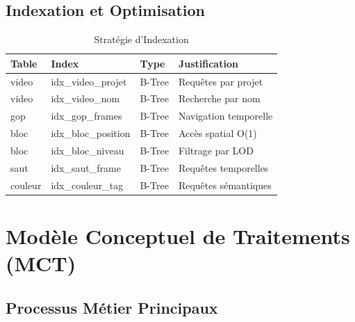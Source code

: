 \documentclass[12pt,a4paper]{article}
\begin{document}
	\subsection{Indexation et Optimisation}
	\label{subsec:indexation}
	
	\begin{table}[h]
		\centering
		\caption{Stratégie d'Indexation}
		\label{tab:indexation}
		\begin{tabular}{@{}llll@{}}
			\toprule
			\textbf{Table} & \textbf{Index} & \textbf{Type} & \textbf{Justification} \\
			\midrule
			video & idx\_video\_projet & B-Tree & Requêtes par projet \\
			video & idx\_video\_nom & B-Tree & Recherche par nom \\
			gop & idx\_gop\_frames & B-Tree & Navigation temporelle \\
			bloc & idx\_bloc\_position & B-Tree & Accès spatial O(1) \\
			bloc & idx\_bloc\_niveau & B-Tree & Filtrage par LOD \\
			saut & idx\_saut\_frame & B-Tree & Requêtes temporelles \\
			couleur & idx\_couleur\_tag & B-Tree & Requêtes sémantiques \\
			\bottomrule
		\end{tabular}
	\end{table}
	
	\section{Modèle Conceptuel de Traitements (MCT)}
	\label{sec:mct}
	
	\subsection{Processus Métier Principaux}
	\label{subsec:processus_metier}
	
\end{document}
